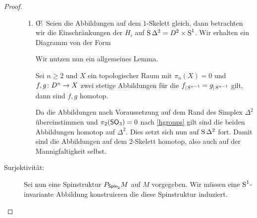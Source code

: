 \begin{Satz}
\begin{proof}
\begin{description}
\begin{enumerate}
			          	\item \OE~Seien die Abbildungen auf dem $ 1 $-Skelett gleich, dann betrachten wir die
			          	Einschränkungen der $ H_i $ auf $ \S \Delta^2 = D^2 \times \S^1$. Wir erhalten ein Diagramm
			          	von der Form
			          	
			          	\begin{center}
			          	\end{center}
			          	
			          	Wir nutzen nun ein allgemeines Lemma.
			          	
			          	\begin{Lem}
		          		Sei $ n\geq 2 $ und $ X $ ein topologischer Raum mit
		          		$ \pi_n(X)=0 $ und 
		          		$ \abb{f,g}{D^n}{X} $ zwei stetige Abbildungen
		          		für die $ f_{|\S^{n-1}} = g_{|\S^{n-1}} $ gilt, dann
		          		sind $ f,g $ homotop.
			          	\end{Lem}
			          	
			          	Da die Abbildungen nach Voraussetzung auf 
			          	dem Rand des Simplex $ \Delta^2 $ übereinstimmen
			          	und $ \pi_2(\so_3)=0 $ nach \cref{hgroups} gilt sind die beiden
			          	Abbildungen homotop auf $ \Delta^2 $. Dies setzt
			          	sich nun auf $ \S \Delta^2 $ fort. Damit sind
			          	die Abbildungen auf dem $ 2 $-Skelett homotop, 
			          	also auch auf der Mannigfaltigkeit selbst.
		          	\end{enumerate}
		  \item[Surjektivität:] Sei nun eine Spinstruktur $ \Ph{\spin_2}{M} $ auf $ M $
		  vorgegeben. Wir müssen eine $ \S^1 $-invariante Abbildung
		  konstruieren die diese Spinstruktur induziert.
		  

\end{description}
\end{proof}
\end{Satz}
